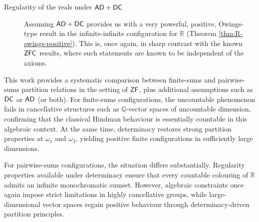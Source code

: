 \documentclass{amsart}
\theoremstyle{definition}
\newcommand{\zf}{\mathnormal{\mathsf{ZF}}}
\newcommand{\dc}{\mathnormal{\mathsf{DC}}}
\newcommand{\ad}{\mathnormal{\mathsf{AD}}}
\newcommand{\zfc}{\mathnormal{\mathsf{ZFC}}}
\theoremstyle{remark}
\numberwithin{equation}{section}
\begin{document}
\begin{description}
\item[Regularity of the reals under $\ad+\dc$]
Assuming $\ad+\dc$ provides us with a very powerful, positive, Owings-type result in the infinite-infinite configuration for $\mathbb R$ (Theorem \ref{thm:R-owings-positive}). This is, once again, in sharp contrast with the known $\zfc$ results, where such statements are known to be independent of the axioms.
\end{description}







This work provides a systematic comparison between finite-sums and pairwise-sums partition relations in the setting of $\zf$, plus additional assumptions such as $\dc$ or $\ad$ (or both). For finite-sums configurations, the uncountable phenomenon fails in cancellative structures such as $\mathbb{Q}$-vector spaces of uncountable dimension, confirming that the classical Hindman behaviour is essentially countable in this algebraic context. 
At the same time, determinacy restores strong partition properties at $\omega_1$ and $\omega_2$, yielding positive finite configurations in sufficiently large dimensions.

For pairwise-sums configurations, the situation differs substantially. 
Regularity properties available under determinacy ensure that every countable colouring of $\mathbb{R}$ admits an infinite monochromatic sumset. 
However, algebraic constraints once again impose strict limitations in highly cancellative groups, while large-dimensional vector spaces regain positive behaviour through determinacy-driven partition principles.
\end{document}
